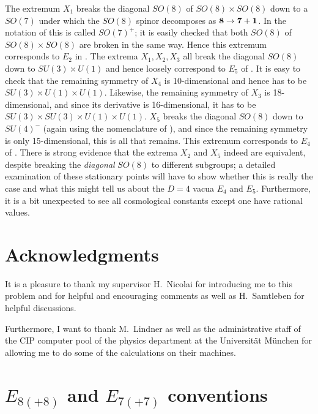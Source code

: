 \documentclass[a4paper,12pt]{article}
\begin{document}
The extremum $X_1$ breaks the diagonal $SO(8)$ of $SO(8)\times SO(8)$
down to a $SO(7)$ under which the $SO(8)$ spinor decomposes as ${\bf
8}\rightarrow{\bf 7}+{\bf 1}$. In the notation of \cite{Warner:vz}
this is called $SO(7)^+$; it is easily checked that both $SO(8)$ of
$SO(8)\times SO(8)$ are broken in the same way. Hence this extremum
corresponds to $E_2$ in \cite{Warner:vz}. The extrema $X_1, X_2, X_3$
all break the diagonal $SO(8)$ down to $SU(3)\times U(1)$ and hence
loosely correspond to $E_5$ of \cite{Warner:vz}. It is easy to check
that the remaining symmetry of $X_4$ is 10-dimensional and hence has
to be $SU(3)\times U(1)\times U(1)$. Likewise, the remaining symmetry
of $X_3$ is 18-dimensional, and since its derivative is
16-dimensional, it has to be $SU(3)\times SU(3)\times U(1)\times
U(1)$. $X_5$ breaks the diagonal $SO(8)$ down to $SU(4)^-$ (again
using the nomenclature of \cite{Warner:vz}), and since the remaining
symmetry is only 15-dimensional, this is all that remains. This
extremum corresponds to $E_4$ of \cite{Warner:vz}. There is strong
evidence that the extrema $X_2$ and $X_5$ indeed are equivalent,
despite breaking the {\em diagonal} $SO(8)$ to different subgroups; a
detailed examination of these stationary points will have to show
whether this is really the case and what this might tell us about the
$D=4$ vacua $E_4$ and $E_5$. Furthermore, it is a bit unexpected to
see all cosmological constants except one have rational values.

\section{Acknowledgments}

It is a pleasure to thank my supervisor H.~Nicolai for introducing me
to this problem and for helpful and encouraging comments as well as
H.~Samtleben for helpful discussions.

Furthermore, I want to thank M.~Lindner as well as the administrative
staff of the CIP computer pool of the physics department at the
Universit\"at M\"unchen for allowing me to do some of the calculations
on their machines.

\newpage
\appendix
\renewcommand{\theequation}{\Alph{section}.\arabic{equation}}
\renewcommand{\thesection}{Appendix \Alph{section}:}

\section{$E_{8(+8)}$ and $E_{7(+7)}$ conventions}
\end{document}
